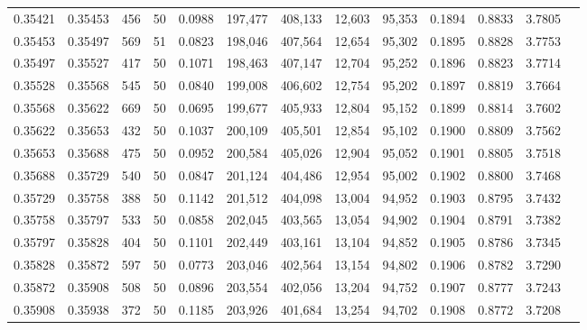 \begin{tabular}{rrrrrrrrrrrrr}
0.35421 & 0.35453 &   456 &  50 &                                     0.0988 & 197,477 & 408,133 &  12,603 &  95,353 & 0.1894 & 0.8833 & 3.7805 \\
0.35453 & 0.35497 &   569 &  51 &                                     0.0823 & 198,046 & 407,564 &  12,654 &  95,302 & 0.1895 & 0.8828 & 3.7753 \\
0.35497 & 0.35527 &   417 &  50 &                                     0.1071 & 198,463 & 407,147 &  12,704 &  95,252 & 0.1896 & 0.8823 & 3.7714 \\
0.35528 & 0.35568 &   545 &  50 &                                     0.0840 & 199,008 & 406,602 &  12,754 &  95,202 & 0.1897 & 0.8819 & 3.7664 \\
0.35568 & 0.35622 &   669 &  50 &                                     0.0695 & 199,677 & 405,933 &  12,804 &  95,152 & 0.1899 & 0.8814 & 3.7602 \\
0.35622 & 0.35653 &   432 &  50 &                                     0.1037 & 200,109 & 405,501 &  12,854 &  95,102 & 0.1900 & 0.8809 & 3.7562 \\
0.35653 & 0.35688 &   475 &  50 &                                     0.0952 & 200,584 & 405,026 &  12,904 &  95,052 & 0.1901 & 0.8805 & 3.7518 \\
0.35688 & 0.35729 &   540 &  50 &                                     0.0847 & 201,124 & 404,486 &  12,954 &  95,002 & 0.1902 & 0.8800 & 3.7468 \\
0.35729 & 0.35758 &   388 &  50 &                                     0.1142 & 201,512 & 404,098 &  13,004 &  94,952 & 0.1903 & 0.8795 & 3.7432 \\
0.35758 & 0.35797 &   533 &  50 &                                     0.0858 & 202,045 & 403,565 &  13,054 &  94,902 & 0.1904 & 0.8791 & 3.7382 \\
0.35797 & 0.35828 &   404 &  50 &                                     0.1101 & 202,449 & 403,161 &  13,104 &  94,852 & 0.1905 & 0.8786 & 3.7345 \\
0.35828 & 0.35872 &   597 &  50 &                                     0.0773 & 203,046 & 402,564 &  13,154 &  94,802 & 0.1906 & 0.8782 & 3.7290 \\
0.35872 & 0.35908 &   508 &  50 &                                     0.0896 & 203,554 & 402,056 &  13,204 &  94,752 & 0.1907 & 0.8777 & 3.7243 \\
0.35908 & 0.35938 &   372 &  50 &                                     0.1185 & 203,926 & 401,684 &  13,254 &  94,702 & 0.1908 & 0.8772 & 3.7208 \\

\end{tabular}
